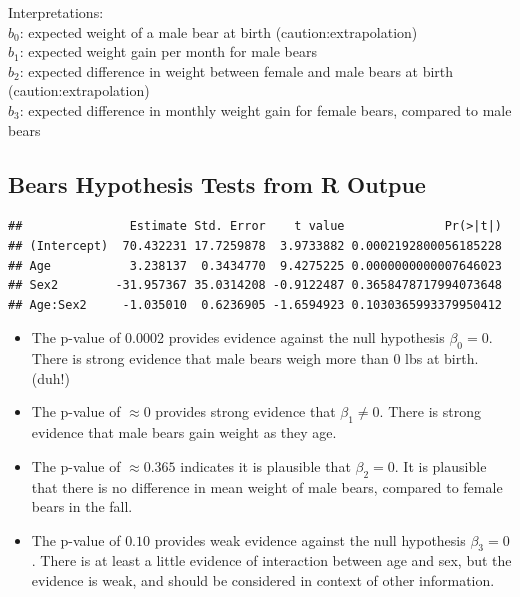 \documentclass[]{book}
\newenvironment{Shaded}{\begin{snugshade}}{\end{snugshade}}
\newcommand{\KeywordTok}[1]{\textcolor[rgb]{0.13,0.29,0.53}{\textbf{#1}}}
\newcommand{\OperatorTok}[1]{\textcolor[rgb]{0.81,0.36,0.00}{\textbf{#1}}}
\newcommand{\NormalTok}[1]{#1}
\begin{document}
Interpretations:\\
\(b_0\): expected weight of a male bear at birth
(caution:extrapolation)\\
\(b_1\): expected weight gain per month for male bears\\
\(b_2\): expected difference in weight between female and male bears at
birth (caution:extrapolation)\\
\(b_3\): expected difference in monthly weight gain for female bears,
compared to male bears

\subsection{Bears Hypothesis Tests from R
Outpue}\label{bears-hypothesis-tests-from-r-outpue}

\begin{Shaded}
\end{Shaded}

\begin{verbatim}
##               Estimate Std. Error    t value              Pr(>|t|)
## (Intercept)  70.432231 17.7259878  3.9733882 0.0002192800056185228
## Age           3.238137  0.3434770  9.4275225 0.0000000000007646023
## Sex2        -31.957367 35.0314208 -0.9122487 0.3658478717994073648
## Age:Sex2     -1.035010  0.6236905 -1.6594923 0.1030365993379950412
\end{verbatim}

\begin{itemize}
\item
  The p-value of 0.0002 provides evidence against the null hypothesis
  \(\beta_0=0\). There is strong evidence that male bears weigh more
  than 0 lbs at birth. (duh!)
\item
  The p-value of \(\approx0\) provides strong evidence that
  \(\beta_1\neq0\). There is strong evidence that male bears gain weight
  as they age.
\item
  The p-value of \(\approx 0.365\) indicates it is plausible that
  \(\beta_2=0\). It is plausible that there is no difference in mean
  weight of male bears, compared to female bears in the fall.
\item
  The p-value of \(0.10\) provides weak evidence against the null
  hypothesis \(\beta_3=0\). There is at least a little evidence of
  interaction between age and sex, but the evidence is weak, and should
  be considered in context of other information.
\end{itemize}
\end{document}
